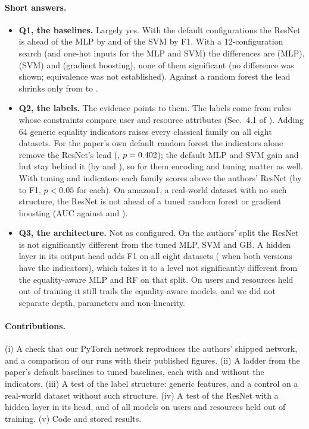 \documentclass[11pt,a4paper]{article}
\begin{document}
\paragraph{Short answers.}
\begin{itemize}[itemsep=2pt]
\item \textbf{Q1, the baselines.} Largely yes. With the default configurations the ResNet is ahead of the MLP by \dMlpRawTheirsU{} and of the SVM by \dSvmTheirsU{} F1. With a 12-configuration search (and one-hot inputs for the MLP and SVM) the differences are \dMlpTuned{} (MLP), \dSvmTuned{} (SVM) and \dGbTuned{} (gradient boosting), none of them significant (no difference was shown; equivalence was not established). Against a random forest the lead shrinks only from \dRfTheirs{} to \dRfTuned{}.
\item \textbf{Q2, the labels.} The evidence points to them. The labels come from rules whose constraints compare user and resource attributes (Sec.~4.1 of \cite{nobi2022}). Adding 64 generic equality indicators raises every classical family on all eight datasets. For the paper's own default random forest the indicators alone remove the ResNet's lead (\dRfTheirsEq, $p=0.402$); the default MLP and SVM gain \gainDefMlpU{} and \gainDefSvmU{} but stay behind it (by \dMlpRawTheirsEqU{} and \dSvmTheirsEqU{}), so for them encoding and tuning matter as well. With tuning and indicators each family scores above the authors' ResNet (by \dMlpTunedEqU{} to \dGbTunedEqU{} F1, $p<0.05$ for each). On amazon1, a real-world dataset with no such structure, the ResNet is not ahead of a tuned random forest or gradient boosting (AUC \amResnetAuc{} against \amRfTunedAuc{} and \amGbTunedAuc).
\item \textbf{Q3, the architecture.} Not as configured. On the authors' split the ResNet is not significantly different from the tuned MLP, SVM and GB. A hidden layer in its output head adds \vHeadVsResnetU{} F1 on all eight datasets (\vHeadEqVsEqU{} when both versions have the indicators), which takes it to a level not significantly different from the equality-aware MLP and RF on that split. On users and resources held out of training it still trails the equality-aware models, and we did not separate depth, parameters and non-linearity.
\end{itemize}

\paragraph{Contributions.} (i) A check that our PyTorch network reproduces the authors' shipped network, and a comparison of our runs with their published figures. (ii) A ladder from the paper's default baselines to tuned baselines, each with and without the indicators. (iii) A test of the label structure: generic features, and a control on a real-world dataset without such structure. (iv) A test of the ResNet with a hidden layer in its head, and of all models on users and resources held out of training. (v) Code and stored results.
\end{document}
